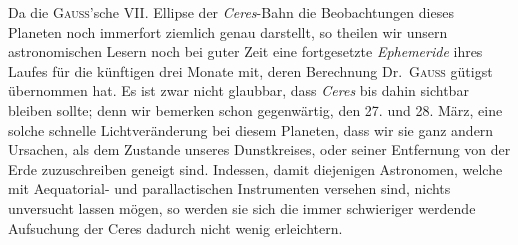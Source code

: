 Da die \textsc{Gauss}'sche VII. Ellipse der \textit{Ceres}-Bahn die Beobachtungen dieses Planeten noch immerfort ziemlich genau darstellt, so theilen wir unsern astronomischen Lesern noch bei guter Zeit eine fortgesetzte \textit{Ephemeride} ihres Laufes für die künftigen drei Monate mit, deren Berechnung Dr.\ \textsc{Gauss} gütigst übernommen hat. Es ist zwar nicht glaubbar, dass \textit{Ceres} bis dahin sichtbar bleiben sollte; denn wir bemerken schon gegenwärtig, den 27. und 28. März, eine solche schnelle Lichtveränderung bei diesem Planeten, dass wir sie ganz andern Ursachen, als dem Zustande unseres Dunstkreises, oder seiner Entfernung von der Erde zuzuschreiben geneigt sind. Indessen, damit diejenigen Astronomen, welche mit Aequatorial- und parallactischen Instrumenten versehen sind, nichts unversucht lassen mögen, so werden sie sich die immer schwieriger werdende Aufsuchung der Ceres dadurch nicht wenig erleichtern.
